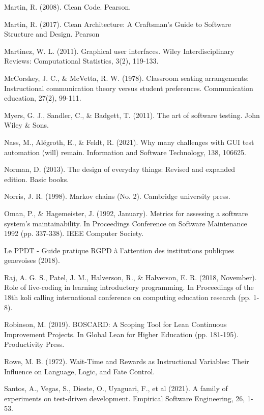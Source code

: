 \documentclass[10pt]{article}
\begin{document}
\begin{thebibliography}{Xyzz12}
 Martin, R. (2008). Clean Code. Pearson.

 Martin, R. (2017). Clean Architecture: A Craftsman’s Guide to Software Structure and Design. Pearson

 Martinez, W. L. (2011). Graphical user interfaces. Wiley Interdisciplinary Reviews: Computational Statistics, 3(2), 119-133.

 McCorskey, J. C., \& McVetta, R. W. (1978). Classroom seating arrangements: Instructional communication theory versus student preferences. Communication education, 27(2), 99-111.

 Myers, G. J., Sandler, C., \& Badgett, T. (2011). The art of software testing. John Wiley \& Sons.

 Nass, M., Alégroth, E., \& Feldt, R. (2021). Why many challenges with GUI test automation (will) remain. Information and Software Technology, 138, 106625.

 Norman, D. (2013). The design of everyday things: Revised and expanded edition. Basic books.

 Norris, J. R. (1998). Markov chains (No. 2). Cambridge university press.

 Oman, P., \& Hagemeister, J. (1992, January). Metrics for assessing a software system's maintainability. In Proceedings Conference on Software Maintenance 1992 (pp. 337-338). IEEE Computer Society.


 Le PPDT - Guide pratique RGPD à l'attention des institutions publiques genevoises (2018).

 Raj, A. G. S., Patel, J. M., Halverson, R., \& Halverson, E. R. (2018, November). Role of live-coding in learning introductory programming. In Proceedings of the 18th koli calling international conference on computing education research (pp. 1-8).

 Robinson, M. (2019). BOSCARD: A Scoping Tool for Lean Continuous Improvement Projects. In Global Lean for Higher Education (pp. 181-195). Productivity Press.

 Rowe, M. B. (1972). Wait-Time and Rewards as Instructional Variables: Their Influence on Language, Logic, and Fate Control.

Santos, A., Vegas, S., Dieste, O., Uyaguari, F., et al (2021). A family of experiments on test-driven development. Empirical Software Engineering, 26, 1-53.


\end{thebibliography}
\end{document}
